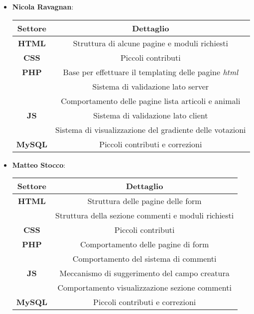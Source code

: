 \begin{itemize}
    \item \textbf{Nicola Ravagnan}: 
    \begin{center}
        \begin{tabular}{| c | c |}
            \hline
            \textbf{Settore} & \textbf{Dettaglio}  \\ [0.5ex]
            \hline \hline
            \textbf{HTML} & Struttura di alcune pagine e moduli richiesti \\
            \hline
            \textbf{CSS} & Piccoli contributi \\
            \hline
            \textbf{PHP} & Base per effettuare il templating delle pagine \textit{html} \\
             & Sistema di validazione lato server \\
             & Comportamento delle pagine lista articoli e animali \\
             \hline
            \textbf{JS} & Sistema di validazione lato client \\
             & Sistema di visualizzazione del gradiente delle votazioni \\
            \hline
            \textbf{MySQL} & Piccoli contributi e correzioni \\
            \hline
        \end{tabular}
    \end{center}

    \item \textbf{Matteo Stocco}: 
    \begin{center}
        \begin{tabular}{| c | c |}
            \hline
            \textbf{Settore} & \textbf{Dettaglio}  \\ [0.5ex]
            \hline \hline
            \textbf{HTML} & Struttura delle pagine delle form \\
            & Struttura della sezione commenti e moduli richiesti \\
            \hline
            \textbf{CSS} & Piccoli contributi \\
            \hline
            \textbf{PHP} & Comportamento delle pagine di form \\
            & Comportamento del sistema di commenti \\
            \hline
            \textbf{JS} & Meccanismo di suggerimento del campo creatura \\
            & Comportamento visualizzazione sezione commenti \\
            \hline
            \textbf{MySQL} & Piccoli contributi e correzioni \\
            \hline
        \end{tabular}
    \end{center}


\end{itemize}
